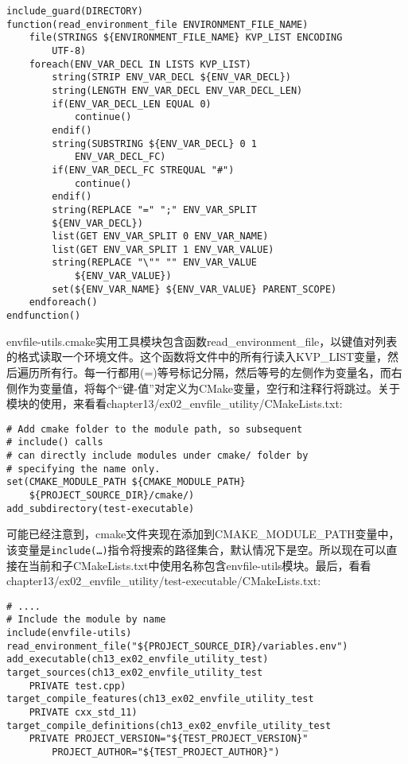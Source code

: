 \begin{lstlisting}[style=styleCMake]
include_guard(DIRECTORY)
function(read_environment_file ENVIRONMENT_FILE_NAME)
	file(STRINGS ${ENVIRONMENT_FILE_NAME} KVP_LIST ENCODING
		UTF-8)
	foreach(ENV_VAR_DECL IN LISTS KVP_LIST)
		string(STRIP ENV_VAR_DECL ${ENV_VAR_DECL})
		string(LENGTH ENV_VAR_DECL ENV_VAR_DECL_LEN)
		if(ENV_VAR_DECL_LEN EQUAL 0)
			continue()
		endif()
		string(SUBSTRING ${ENV_VAR_DECL} 0 1
			ENV_VAR_DECL_FC)
		if(ENV_VAR_DECL_FC STREQUAL "#")
			continue()
		endif()
		string(REPLACE "=" ";" ENV_VAR_SPLIT
		${ENV_VAR_DECL})
		list(GET ENV_VAR_SPLIT 0 ENV_VAR_NAME)
		list(GET ENV_VAR_SPLIT 1 ENV_VAR_VALUE)
		string(REPLACE "\"" "" ENV_VAR_VALUE
			${ENV_VAR_VALUE})
		set(${ENV_VAR_NAME} ${ENV_VAR_VALUE} PARENT_SCOPE)
	endforeach()
endfunction()
\end{lstlisting}

envfile-utils.cmake实用工具模块包含函数read\_environment\_file，以键值对列表的格式读取一个环境文件。这个函数将文件中的所有行读入KVP\_LIST变量，然后遍历所有行。每一行都用(=)等号标记分隔，然后等号的左侧作为变量名，而右侧作为变量值，将每个“键-值”对定义为CMake变量，空行和注释行将跳过。关于模块的使用，来看看chapter13/ex02\_envfile\_utility/CMakeLists.txt:

\begin{lstlisting}[style=styleCMake]
# Add cmake folder to the module path, so subsequent 
# include() calls
# can directly include modules under cmake/ folder by
# specifying the name only.
set(CMAKE_MODULE_PATH ${CMAKE_MODULE_PATH}
	${PROJECT_SOURCE_DIR}/cmake/)
add_subdirectory(test-executable)
\end{lstlisting}

可能已经注意到，cmake文件夹现在添加到CMAKE\_MODULE\_PATH变量中，该变量是\texttt{include(…)}指令将搜索的路径集合，默认情况下是空。所以现在可以直接在当前和子CMakeLists.txt中使用名称包含envfile-utils模块。最后，看看chapter13/ex02\_envfile\_utility/test-executable/CMakeLists.txt:

\begin{lstlisting}[style=styleCMake]
# ....
# Include the module by name
include(envfile-utils)
read_environment_file("${PROJECT_SOURCE_DIR}/variables.env")
add_executable(ch13_ex02_envfile_utility_test)
target_sources(ch13_ex02_envfile_utility_test
	PRIVATE test.cpp)
target_compile_features(ch13_ex02_envfile_utility_test
	PRIVATE cxx_std_11)
target_compile_definitions(ch13_ex02_envfile_utility_test
	PRIVATE PROJECT_VERSION="${TEST_PROJECT_VERSION}"
		PROJECT_AUTHOR="${TEST_PROJECT_AUTHOR}")
\end{lstlisting}

